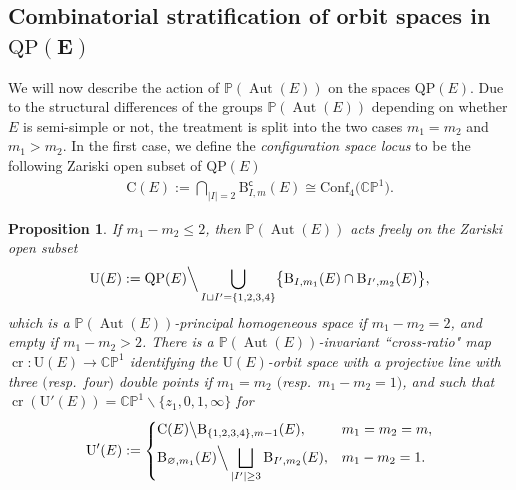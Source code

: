 \documentclass[pdftex]{sigma}
\newcommand{\field}[1]{\ensuremath{\mathbb{#1}}}
\newcommand{\CC}{\field{C}}
\newcommand{\PP}{\field{P}}
\DeclareMathOperator{\Aut}{Aut}
\numberwithin{equation}{section}
\newtheorem{Proposition}[Theorem]{Proposition}
 { \theoremstyle{definition}
\newtheorem{Definition}[Theorem]{Definition}
\newtheorem{Note}[Theorem]{Note}
\newtheorem{Example}[Theorem]{Example}
\newtheorem{Remark}[Theorem]{Remark} }
\begin{document}
\subsection[Combinatorial stratification of orbit spaces in QP(E)]
{Combinatorial stratification of orbit spaces in $\boldsymbol{\mathrm{QP}(E)}$}%
We will now describe the action of $\PP(\Aut(E))$ on the spaces $\mathrm{QP}(E)$. Due to the structural differences of the groups $\PP(\Aut(E))$ depending on whether $E$ is semi-simple or not, the treatment is split into the two cases $m_{1} = m_{2}$ and $m_{1} > m_{2}$. In the first case, we define the \emph{configuration space locus} to be the following Zariski open subset of $\mathrm{QP}(E)$
\begin{gather*}%
\mathrm{C}(E):=\bigcap_{\vert I\vert =2} \mathrm{B}^{\mathsf{c}}_{I,m}(E)\cong \mathrm{Conf}_{4}\big(\CC\PP^{1}\big).
\end{gather*}


\begin{Proposition}\label{prop:U}
If $m_{1}-m_{2} \leq 2$, then $\PP(\Aut(E))$ acts freely on the Zariski open subset
\[
\mathrm{U}(E) :=
\displaystyle\mathrm{QP}(E)\Big\backslash \bigcup_{I\sqcup I' = \{1,2,3,4\}} \bigl\{\mathrm{B}_{I,m_{1}}(E)\cap\mathrm{B}_{I',m_{2}}(E)\bigr\},
\]
which is a $\PP(\Aut(E))$-principal homogeneous space if $m_{1}-m_{2}=2$, and empty if $m_{1}-m_{2}>2$. There is a $\PP(\Aut(E))$-invariant ``cross-ratio" map $\operatorname{cr}\colon \mathrm{U}(E)\rightarrow \CC\PP^{1}$ identifying the $\mathrm{U}(E)$-orbit space with a projective line with three $($resp.~four$)$ double points if $m_{1} = m_{2}$ $($resp.~$m_{1} - m_{2} = 1)$, and such that $\operatorname{cr}(\mathrm{U}'(E)) = \CC\PP^{1}\backslash\{z_{1},0,1,\infty\}$ for
\[
\mathrm{U}'(E):= \begin{cases}
\mathrm{C}(E)\big\backslash\mathrm{B}_{\{1,2,3,4\},m-1}(E), & m_{1}=m_{2}=m,
\\[1ex]
\displaystyle\mathrm{B}_{\varnothing ,m_{1}}(E)\Big\backslash\bigsqcup_{\vert I'\vert \geq 3} \mathrm{B}_{I',m_{2}}(E), & m_{1}-m_{2}=1.
\end{cases}
\]
\end{Proposition}
\end{document}
